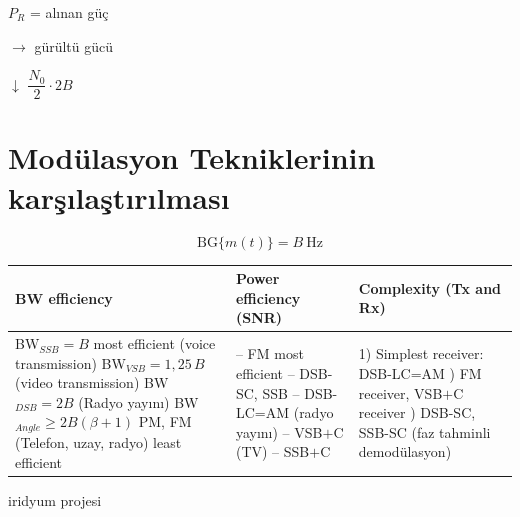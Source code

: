 \documentclass[11pt,a4paper]{article}
\begin{document}
$P_R$ = alınan güç

 $\rightarrow$ gürültü gücü

$\downarrow$ \quad $\dfrac{N_0}{2}\cdot 2B$

\section{Modülasyon Tekniklerinin karşılaştırılması}
\[ \mathrm{BG}\{m(t)\} = B\ \mathrm{Hz} \]

\begin{tabular}{@{}p{}p{}p{}@{}}
\toprule
\textbf{BW efficiency} & \textbf{Power efficiency (SNR)} & \textbf{Complexity (Tx and Rx)} \\
\midrule
BW$_{SSB}=B$ most efficient (voice transmission) \newline
BW$_{VSB}=1{,}25\,B$ (video transmission) \newline
BW$_{DSB}=2B$ (Radyo yayını) \newline
BW$_{Angle}\geq 2B(\beta+1)$ \quad PM, FM (Telefon, uzay, radyo) \newline
least efficient
&
-- FM most efficient \newline
-- DSB-SC, SSB \newline
-- DSB-LC=AM (radyo yayını) \newline
-- VSB$+$C (TV) \newline
-- SSB$+$C
&
1) Simplest receiver: DSB-LC=AM \newline
2) FM receiver, VSB$+$C receiver \newline
3) DSB-SC, SSB-SC (faz tahminli demodülasyon) \\
\bottomrule
\end{tabular}

iridyum projesi
\end{document}
